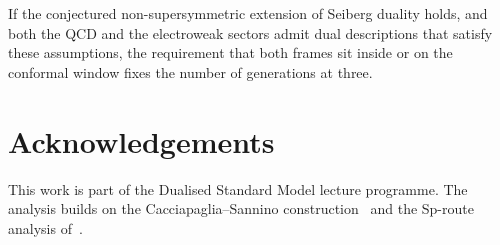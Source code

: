 \documentclass[11pt,a4paper]{article}
\theoremstyle{plain}
\theoremstyle{definition}
\theoremstyle{remark}
\begin{document}
If the conjectured non-supersymmetric extension of Seiberg duality holds,
and both the QCD and the electroweak sectors admit dual descriptions that
satisfy these assumptions, the requirement that both frames sit inside or
on the conformal window fixes the number of generations at three.


\section*{Acknowledgements}

This work is part of the Dualised Standard Model lecture programme.
The analysis builds on the Cacciapaglia--Sannino
construction~\cite{CacciapagliaSannino2024} and the Sp-route analysis
of~\cite{Paper1}.
\end{document}
